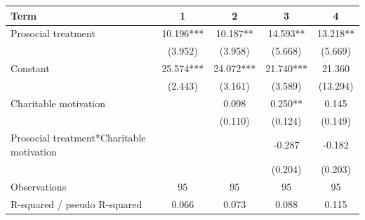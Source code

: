 \begin{tabular}{lcccc}
\hline
Term & 1 & 2 & 3 & 4 \\
\hline
Prosocial treatment & 10.196*** & 10.187** & 14.593** & 13.218** \\
 & (3.952) & (3.958) & (5.668) & (5.669) \\
Constant & 25.574*** & 24.072*** & 21.740*** & 21.360 \\
 & (2.443) & (3.161) & (3.589) & (13.294) \\
Charitable motivation &  & 0.098 & 0.250** & 0.145 \\
 &  & (0.110) & (0.124) & (0.149) \\
Prosocial treatment*Charitable motivation &  &  & -0.287 & -0.182 \\
 &  &  & (0.204) & (0.203) \\
Observations & 95 & 95 & 95 & 95 \\
R-squared / pseudo R-squared & 0.066 & 0.073 & 0.088 & 0.115 \\
\hline
\end{tabular}
